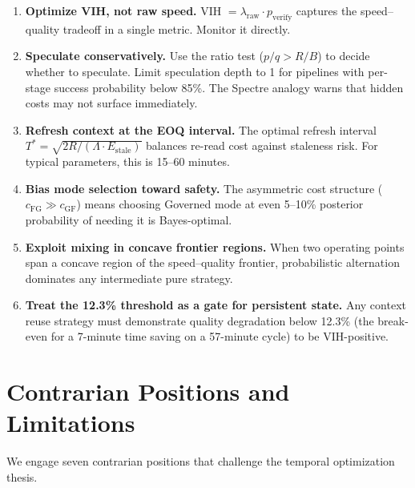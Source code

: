 \documentclass[11pt,a4paper]{article}
\theoremstyle{definition}
\theoremstyle{remark}
\begin{document}
\begin{enumerate}
    \item \textbf{Optimize VIH, not raw speed.} VIH $= \lambda_{\mathrm{raw}} \cdot p_{\mathrm{verify}}$ captures the speed--quality tradeoff in a single metric. Monitor it directly.

    \item \textbf{Speculate conservatively.} Use the ratio test ($p/q > R/B$) to decide whether to speculate. Limit speculation depth to 1 for pipelines with per-stage success probability below 85\%. The Spectre analogy warns that hidden costs may not surface immediately.

    \item \textbf{Refresh context at the EOQ interval.} The optimal refresh interval $T^* = \sqrt{2R/(\Lambda \cdot E_{\mathrm{stale}})}$ balances re-read cost against staleness risk. For typical parameters, this is 15--60 minutes.

    \item \textbf{Bias mode selection toward safety.} The asymmetric cost structure ($c_{\mathrm{FG}} \gg c_{\mathrm{GF}}$) means choosing Governed mode at even 5--10\% posterior probability of needing it is Bayes-optimal.

    \item \textbf{Exploit mixing in concave frontier regions.} When two operating points span a concave region of the speed--quality frontier, probabilistic alternation dominates any intermediate pure strategy.

    \item \textbf{Treat the 12.3\% threshold as a gate for persistent state.} Any context reuse strategy must demonstrate quality degradation below 12.3\% (the break-even for a 7-minute time saving on a 57-minute cycle) to be VIH-positive.
\end{enumerate}


\section{Contrarian Positions and Limitations}\label{sec:contrarian}

We engage seven contrarian positions that challenge the temporal optimization thesis.
\end{document}
